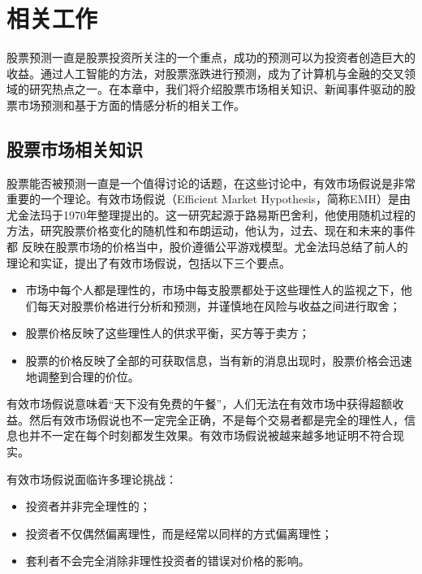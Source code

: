 \chapter{相关工作}
\label{cha:relatedwork}

股票预测一直是股票投资所关注的一个重点，成功的预测可以为投资者创造巨大的收益。通过人工智能的方法，对股票涨跌进行预测，成为了计算机与金融的交叉领域的研究热点之一。在本章中，我们将介绍股票市场相关知识、新闻事件驱动的股票市场预测和基于方面的情感分析的相关工作。
\section{股票市场相关知识}
股票能否被预测一直是一个值得讨论的话题，在这些讨论中，有效市场假说是非常重要的一个理论。有效市场假说（Efficient Market Hypothesis，简称EMH）是由尤金法玛于1970年整理提出的\cite{fama1970efficient}。这一研究起源于路易斯巴舍利，他使用随机过程的方法，研究股票价格变化的随机性和布朗运动，他认为，过去、现在和未来的事件都 反映在股票市场的价格当中，股价遵循公平游戏模型。尤金法玛总结了前人的理论和实证，提出了有效市场假说，包括以下三个要点。
\begin{itemize}
    \item 市场中每个人都是理性的，市场中每支股票都处于这些理性人的监视之下，他们每天对股票价格进行分析和预测，并谨慎地在风险与收益之间进行取舍；
    \item 股票价格反映了这些理性人的供求平衡，买方等于卖方；
    \item 股票的价格反映了全部的可获取信息，当有新的消息出现时，股票价格会迅速地调整到合理的价位。
\end{itemize}

有效市场假说意味着“天下没有免费的午餐”，人们无法在有效市场中获得超额收益。然后有效市场假说也不一定完全正确，不是每个交易者都是完全的理性人，信息也并不一定在每个时刻都发生效果。有效市场假说被越来越多地证明不符合现实。

有效市场假说面临许多理论挑战：
\begin{itemize}
	\item 投资者并非完全理性的；
	\item 投资者不仅偶然偏离理性，而是经常以同样的方式偏离理性；
	\item 套利者不会完全消除非理性投资者的错误对价格的影响。
\end{itemize}

